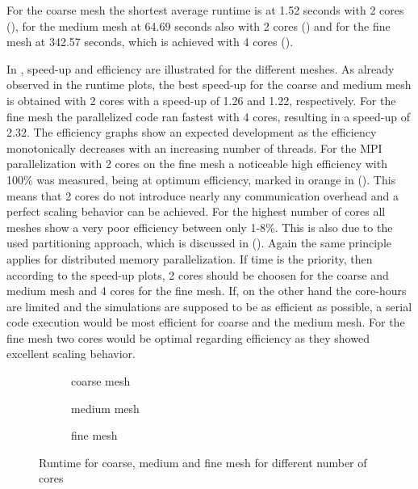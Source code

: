 For the coarse mesh the shortest average runtime is at 1.52 seconds with 2 cores (), for the medium mesh at 64.69 seconds also with 2 cores () and for the fine mesh at 342.57 seconds, which is achieved with 4 cores (). 

In , speed-up and efficiency are illustrated for the different meshes. As already observed in the runtime plots, the best speed-up for the coarse and medium mesh is obtained with 2 cores with a speed-up of 1.26 and 1.22, respectively. For the fine mesh the parallelized code ran fastest with 4 cores, resulting in a speed-up of 2.32. The efficiency graphs show an expected development as the efficiency monotonically decreases with an increasing number of threads. For the MPI parallelization with 2 cores on the fine mesh a noticeable high efficiency with 100\% was measured, being at optimum efficiency, marked in orange in (). This means that 2 cores do not introduce nearly any communication overhead and a perfect scaling behavior can be achieved. 
For the highest number of cores all meshes show a very poor efficiency between only 1-8\%. This is also due to the used partitioning approach, which is discussed in ().
Again the same principle applies for distributed memory parallelization. If time is the priority, then according to the speed-up plots, 2 cores should be choosen for the coarse and medium mesh and 4 cores for the fine mesh. If, on the other hand the core-hours are limited and the simulations are supposed to be as efficient as possible, a serial code execution would be most efficient for coarse and the medium mesh. For the fine mesh two cores would be optimal regarding efficiency as they showed excellent scaling behavior.
\begin{figure}[h!]
	\centering
	\begin{subfigure}{0.7\textwidth}
		\centering
		\resizebox{0.6\width}{!}{}
		\caption{\label{fig::RcoarseMPI} coarse mesh}
	\end{subfigure}
	\hfill
	\begin{subfigure}{0.7\textwidth}
		\centering
		\resizebox{0.6\width}{!}{}
		\caption{\label{fig::RmediumMPI} medium mesh}
	\end{subfigure}
	\hfill
	\begin{subfigure}{0.7\textwidth}
		\centering
		\resizebox{0.6\width}{!}{}
		\caption{\label{fig::RfineMPI} fine mesh}
	\end{subfigure}
	\caption{\label{fig::RuntimeMPI} Runtime for coarse, medium and fine mesh for different number of cores}
\end{figure}
\clearpage



